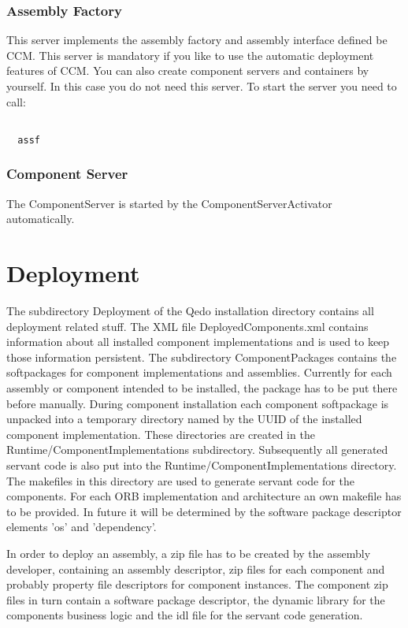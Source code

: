 \documentclass[12pt,a4paper]{report}
\begin{document}
\subsection{Assembly Factory}
\label{sec:AssemblyFactory}

This server implements the assembly factory and assembly interface defined be CCM. This server is mandatory if you like to use the automatic deployment features of CCM. You can also create component servers and containers by yourself. In this case you do not need this server. To start the server you need to call:

\small
\begin{verbatim}

  assf

\end{verbatim}
\normalsize

\subsection{Component Server}
\label{sec:ComponentServer}

The ComponentServer is started by the ComponentServerActivator automatically.


\chapter{Deployment}
\label{sec:Deployment}
The subdirectory Deployment of the Qedo installation directory contains all deployment related stuff. The XML file DeployedComponents.xml contains information about all installed component implementations and is used to keep those information persistent. The subdirectory ComponentPackages contains the softpackages for component implementations and assemblies. Currently for each assembly or component intended to be installed, the package has to be put there before manually. During component installation each component softpackage is unpacked into a temporary directory named by the UUID of the installed component implementation. These directories are created in the Runtime/ComponentImplementations subdirectory. Subsequently all generated servant code is also put into the Runtime/ComponentImplementations directory. The makefiles in this directory are used to generate servant code for the components. For each ORB implementation and architecture an own makefile
has to be provided. In future it will be determined by the software package descriptor elements 'os' and 'dependency'.

In order to deploy an assembly, a zip file has to be created by the assembly developer, containing an assembly descriptor, zip files for each component  and probably property file descriptors for component instances. The component zip files in turn contain a software package descriptor, the dynamic library for the components business logic and the idl file for the servant code generation.
\end{document}
